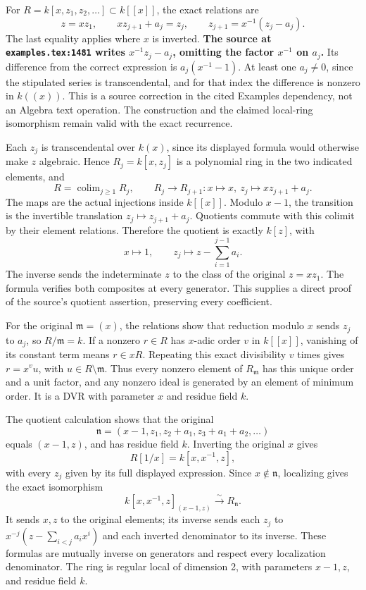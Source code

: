 For \(R=k[x,z_1,z_2,\ldots]\subset k[[x]]\), the exact relations are \[
 z=xz_1,\qquad xz_{j+1}+a_j=z_j,
 \qquad z_{j+1}=x^{-1}(z_j-a_j).
\] The last equality applies where \(x\) is inverted. \textbf{The source at \texttt{examples.\AlgebraIdentifierBreak{}tex:\AlgebraIdentifierBreak{}1481} writes \(x^{-1}z_j-a_j\), omitting the factor \(x^{-1}\) on \(a_j\).} Its difference from the correct expression is \(a_j(x^{-1}-1)\). At least one \(a_j\ne0\), since the stipulated series is transcendental, and for that index the difference is nonzero in \(k((x))\). This is a source correction in the cited Examples dependency, not an Algebra text operation. The construction and the claimed local-ring isomorphism remain valid with the exact recurrence.

Each \(z_j\) is transcendental over \(k(x)\), since its displayed formula would otherwise make \(z\) algebraic. Hence \(R_j=k[x,z_j]\) is a polynomial ring in the two indicated elements, and \[
 R=\operatorname{colim}_{j\ge1}R_j,\qquad
 R_j\to R_{j+1}:x\mapsto x,\ z_j\mapsto xz_{j+1}+a_j.
\] The maps are the actual injections inside \(k[[x]]\). Modulo \(x-1\), the transition is the invertible translation \(z_j\mapsto z_{j+1}+a_j\). Quotients commute with this colimit by their element relations. Therefore the quotient is exactly \(k[z]\), with \[
 x\mapsto1,\qquad z_j\mapsto z-\sum_{i=1}^{j-1}a_i.
\] The inverse sends the indeterminate \(z\) to the class of the original \(z=xz_1\). The formula verifies both composites at every generator. This supplies a direct proof of the source's quotient assertion, preserving every coefficient.

For the original \(\mathfrak m=(x)\), the relations show that reduction modulo \(x\) sends \(z_j\) to \(a_j\), so \(R/\mathfrak m=k\). If a nonzero \(r\in R\) has \(x\)-adic order \(v\) in \(k[[x]]\), vanishing of its constant term means \(r\in xR\). Repeating this exact divisibility \(v\) times gives \(r=x^vu\), with \(u\in R\setminus\mathfrak m\). Thus every nonzero element of \(R_{\mathfrak m}\) has this unique order and a unit factor, and any nonzero ideal is generated by an element of minimum order. It is a DVR with parameter \(x\) and residue field \(k\).

The quotient calculation shows that the original \[
 \mathfrak n=(x-1,z_1,z_2+a_1,z_3+a_1+a_2,\ldots)
\] equals \((x-1,z)\), and has residue field \(k\). Inverting the original \(x\) gives \[
 R[1/x]=k[x,x^{-1},z],
\] with every \(z_j\) given by its full displayed expression. Since \(x\notin\mathfrak n\), localizing gives the exact isomorphism \[
 k[x,x^{-1},z]_{(x-1,z)}\xrightarrow{\sim}R_{\mathfrak n}.
\] It sends \(x,z\) to the original elements; its inverse sends each \(z_j\) to \(x^{-j}(z-\sum_{i<j}a_ix^i)\) and each inverted denominator to its inverse. These formulas are mutually inverse on generators and respect every localization denominator. The ring is regular local of dimension 2, with parameters \(x-1,z\), and residue field \(k\).

